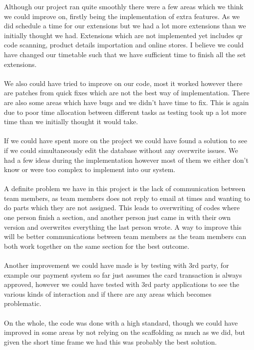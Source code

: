 \documentclass[a4paper]{article}
\begin{document}
Although our project ran quite smoothly there were a few areas which we think we could improve on, firstly being the implementation of extra features. As we did schedule a time for our extensions but we had a lot more extensions than we initially thought we had. Extensions which are not implemented yet includes qr code scanning, product details importation and online stores. I believe we could have changed our timetable such that we have sufficient time to finish all the set extensions.
\\\\
We also could have tried to improve on our code, most it worked however there are patches from quick fixes which are not the best way of implementation. There are also some areas which have bugs and we didn't have time to fix. This is again due to poor time allocation between different tasks as testing took up a lot more time than we initially thought it would take. 
\\\\
If we could have spent more on the project we could have found a solution to see if we could simultaneously edit the database without any overwrite issues. We had a few ideas during the implementation however most of them we either don't know or were too complex to implement into our system. 
\\\\
A definite problem we have in this project is the lack of communication between team members, as team members does not reply to email at times and wanting to do parts which they are not assigned. This leads to overwriting of codes where one person finish a section, and another person just came in with their own version and overwrites everything the last person wrote. A way to improve this will be better communications between team members as the team members can both work together on the same section for the best outcome.
\\\\
Another improvement we could have made is by testing with 3rd party, for example our payment system so far just assumes the card transaction is always approved, however we could have tested with 3rd party applications to see the various kinds of interaction and if there are any areas which becomes problematic. 
\\\\
On the whole, the code was done with a high standard, though we could have improved in some areas by not  relying on the scaffolding as much as we did, but given the short time frame we had this was probably the best solution. 
\end{document}
